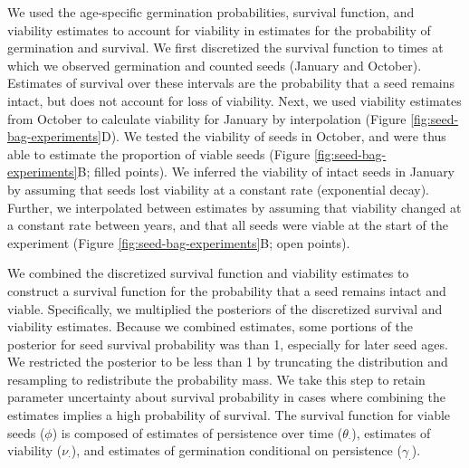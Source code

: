 \documentclass[12pt, oneside, titlepage]{article}   	%
\begin{document}
We used the age-specific germination probabilities, survival function, and viability estimates to account for viability in estimates for the probability of germination and survival. We first discretized the survival function to times at which we observed germination and counted seeds (January and October). Estimates of survival over these intervals are the probability that a seed remains intact, but does not account for loss of viability. Next, we used viability estimates from October to calculate viability for January by interpolation (Figure \ref{fig:seed-bag-experiments}D). We tested the viability of seeds in October, and were thus able to estimate the proportion of viable seeds (Figure \ref{fig:seed-bag-experiments}B; filled points). We inferred the viability of intact seeds in January by assuming that seeds lost viability at a constant rate (exponential decay). Further, we interpolated between estimates by assuming that viability changed at a constant rate between years, and that all seeds were viable at the start of the experiment (Figure \ref{fig:seed-bag-experiments}B; open points). 

We combined the discretized survival function and viability estimates to construct a survival function for the probability that a seed remains intact and viable. Specifically, we multiplied the posteriors of the discretized survival and viability estimates. Because we combined estimates, some portions of the posterior for seed survival probability was than 1, especially for later seed ages. We restricted the posterior to be less than 1 by truncating the distribution and resampling to redistribute the probability mass. We take this step to retain parameter uncertainty about survival probability in cases where combining the estimates implies a high probability of survival. The survival function for viable seeds ($\phi$) is composed of estimates of persistence over time ($\theta_\cdot$), estimates of viability ($\nu_\cdot$), and estimates of germination conditional on persistence ($\gamma_\cdot$).
\end{document}
